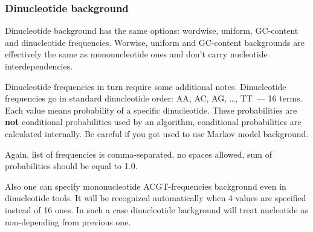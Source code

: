 \subsubsection{Dinucleotide background}
Dinucleotide background has the same options: wordwise, uniform, GC-content and dinucleotide frequencies. Worwise, uniform and GC-content backgrounds are effectively the same as mononucleotide ones and don't carry nucleotide interdependencies.

Dinucleotide frequencies in turn require some additional notes. Dinucleotide frequencies go in standard dinucleotide order: AA, AC, AG, \dots, TT~--- 16 terms. Each value means probability of a specific dinucleotide. These probabilities are \textbf{not} conditional probabilities used by an algorithm, conditional probabilities are calculated internally. Be careful if you got used to use Markov model background.

Again, list of frequencies is comma-separated, no spaces allowed, sum of probabilities should be equal to 1.0.

Also one can specify mononucleotide ACGT-frequencies background even in dinucleotide tools. It will be recognized automatically when 4 values are specified instead of 16 ones. In such a case dinucleotide background will treat nucleotide as non-depending from previous one.
